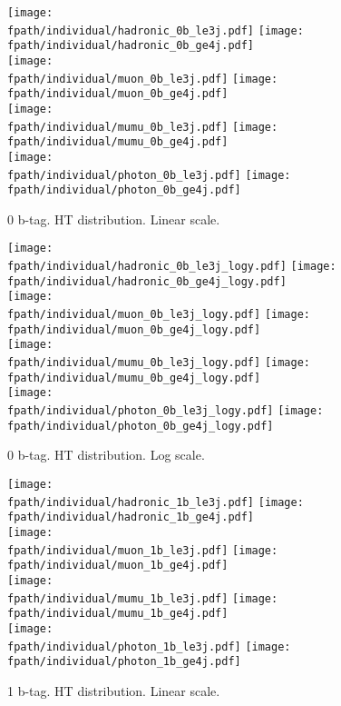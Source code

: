 \documentclass[11pt,a4paper]{article}
\def\fpath{/home/hep/elaird1/public_html/119_2012_categories/v7/}
\begin{document}
\begin{figure}
\begin{center}
\texttt{[image: \\fpath/individual/hadronic\_0b\_le3j.pdf]}
\texttt{[image: \\fpath/individual/hadronic\_0b\_ge4j.pdf]}\\
\texttt{[image: \\fpath/individual/muon\_0b\_le3j.pdf]}
\texttt{[image: \\fpath/individual/muon\_0b\_ge4j.pdf]}\\
\texttt{[image: \\fpath/individual/mumu\_0b\_le3j.pdf]}
\texttt{[image: \\fpath/individual/mumu\_0b\_ge4j.pdf]}\\
\texttt{[image: \\fpath/individual/photon\_0b\_le3j.pdf]}
\texttt{[image: \\fpath/individual/photon\_0b\_ge4j.pdf]}\\
\caption{0 b-tag. HT distribution. Linear scale.}
\end{center}
\end{figure}


\begin{figure}
\begin{center}
\texttt{[image: \\fpath/individual/hadronic\_0b\_le3j\_logy.pdf]}
\texttt{[image: \\fpath/individual/hadronic\_0b\_ge4j\_logy.pdf]}\\
\texttt{[image: \\fpath/individual/muon\_0b\_le3j\_logy.pdf]}
\texttt{[image: \\fpath/individual/muon\_0b\_ge4j\_logy.pdf]}\\
\texttt{[image: \\fpath/individual/mumu\_0b\_le3j\_logy.pdf]}
\texttt{[image: \\fpath/individual/mumu\_0b\_ge4j\_logy.pdf]}\\
\texttt{[image: \\fpath/individual/photon\_0b\_le3j\_logy.pdf]}
\texttt{[image: \\fpath/individual/photon\_0b\_ge4j\_logy.pdf]}\\
\caption{0 b-tag. HT distribution. Log scale.}
\end{center}
\end{figure}


\begin{figure}
\begin{center}
\texttt{[image: \\fpath/individual/hadronic\_1b\_le3j.pdf]}
\texttt{[image: \\fpath/individual/hadronic\_1b\_ge4j.pdf]}\\
\texttt{[image: \\fpath/individual/muon\_1b\_le3j.pdf]}
\texttt{[image: \\fpath/individual/muon\_1b\_ge4j.pdf]}\\
\texttt{[image: \\fpath/individual/mumu\_1b\_le3j.pdf]}
\texttt{[image: \\fpath/individual/mumu\_1b\_ge4j.pdf]}\\
\texttt{[image: \\fpath/individual/photon\_1b\_le3j.pdf]}
\texttt{[image: \\fpath/individual/photon\_1b\_ge4j.pdf]}\\
\caption{1 b-tag. HT distribution. Linear scale.}
\end{center}
\end{figure}
\end{document}
